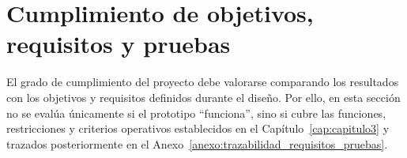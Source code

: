 \section{Cumplimiento de objetivos, requisitos y pruebas}
\label{sec:cumplimiento_objetivos_requisitos}

El grado de cumplimiento del proyecto debe valorarse comparando los resultados con los objetivos y requisitos definidos durante el diseño. Por ello, en esta sección no se evalúa únicamente si el prototipo “funciona”, sino si cubre las funciones, restricciones y criterios operativos establecidos en el Capítulo~\ref{cap:capitulo3} y trazados posteriormente en el Anexo~\ref{anexo:trazabilidad_requisitos_pruebas}.

\begingroup
\scriptsize
\renewcommand{\arraystretch}{1.18}

